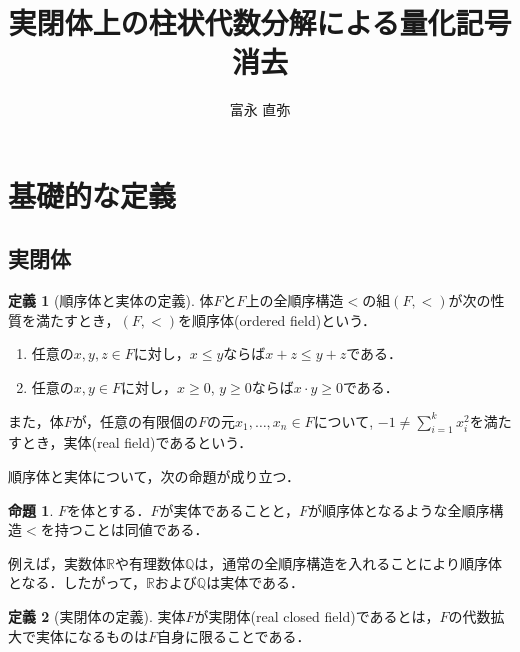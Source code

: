 \documentclass[uplatex, dvipdfmx]{jsarticle}
\newcommand{\R}{\mathbb{R}}
\newcommand{\Q}{\mathbb{Q}}
\theoremstyle{definition}
\newtheorem{definition}{定義}[section]
\newtheorem{proposition}{命題}[section]
\begin{document}
\title{実閉体上の柱状代数分解による量化記号消去}
\author{富永 直弥}
\maketitle

\section{基礎的な定義}

\subsection{実閉体}


\begin{definition}[順序体と実体の定義]
     体$F$と$F$上の全順序構造$<$の組$(F,<)$が次の性質を満たすとき，$(F,<)$を順序体(ordered field)という．
     \begin{enumerate}
          \item 任意の$x,y,z\in F$に対し，$x \leq y$ならば$x + z \leq y + z$である．
          \item 任意の$x,y \in F$に対し，$x \geq 0$, $y \geq 0$ならば$x \cdot y \geq 0$である．
     \end{enumerate}

     また，体$F$が，任意の有限個の$F$の元$x_1, \dots, x_n \in F$について, $-1 \neq \sum_{i=1}^k x_i^2$を満たすとき，実体(real field)であるという．
\end{definition}

順序体と実体について，次の命題が成り立つ．

\begin{proposition}
     $F$を体とする．$F$が実体であることと，$F$が順序体となるような全順序構造$<$を持つことは同値である．
\end{proposition}

例えば，実数体$\R$や有理数体$\Q$は，通常の全順序構造を入れることにより順序体となる．したがって，$\R$および$\Q$は実体である．

\begin{definition}[実閉体の定義]
     実体$F$が実閉体(real closed field)であるとは，$F$の代数拡大で実体になるものは$F$自身に限ることである．
\end{definition}
\end{document}
